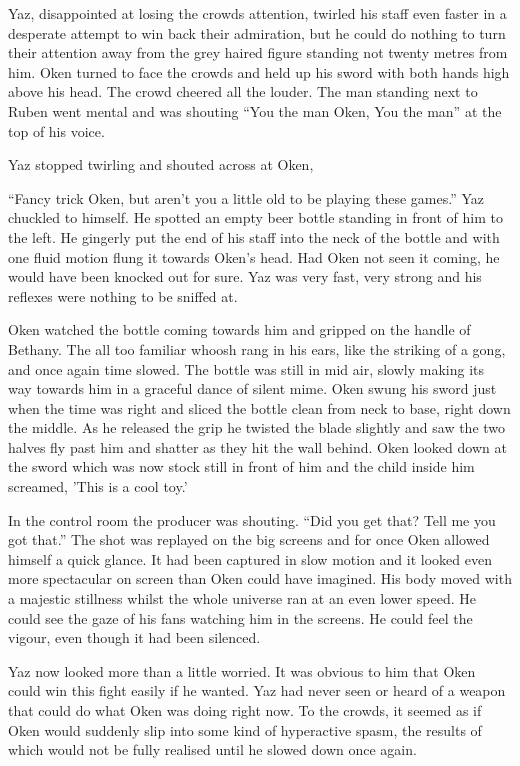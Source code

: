Yaz, disappointed at losing the crowds attention, twirled his staff even faster in a desperate attempt to win back their admiration, but he could do nothing to turn their attention away from the grey haired figure standing not twenty metres from him.  Oken turned to face the crowds and held up his sword with both hands high above his head.  The crowd cheered all the louder.  The man standing next to Ruben went mental and was shouting ``You the man Oken, You the man'' at the top of his voice.

Yaz stopped twirling and shouted across at Oken,

``Fancy trick Oken, but aren't you a little old to be playing these games.''  Yaz chuckled to himself.  He spotted an empty beer bottle standing in front of him to the left.  He gingerly put the end of his staff into the neck of the bottle and with one fluid motion flung it towards Oken's head.  Had Oken not seen it coming, he would have been knocked out for sure.  Yaz was very fast, very strong and his reflexes were nothing to be sniffed at.

Oken watched the bottle coming towards him and gripped on the handle of Bethany.  The all too familiar whoosh rang in his ears,  like the striking of a gong, and once again time slowed.  The bottle was still in mid air, slowly making its way towards him in a graceful dance of silent mime.  Oken swung his sword just when the time was right and sliced the bottle clean from neck to base, right down the middle.  As he released the grip he twisted the blade slightly and saw the two halves fly past him and shatter as they hit the wall behind.  Oken looked down at the sword which was now stock still in front of him and the child inside him screamed, 'This is a cool toy.'  

In the control room the producer was shouting. ``Did you get that?  Tell me you got that.''  The shot was replayed on the big screens and for once Oken allowed himself a quick glance.  It had been captured in slow motion and it looked even more spectacular on screen than Oken could have imagined.  His body moved with a majestic stillness whilst the whole universe ran at an even lower speed.  He could see the gaze of his fans watching him in the screens.  He could feel the vigour, even though it had been silenced.

Yaz now looked more than a little worried.  It was obvious to him that Oken could win this fight easily if he wanted.  Yaz had never seen or heard of a weapon that could do what Oken was doing right now.  To the crowds, it seemed as if Oken would suddenly slip into some kind of hyperactive spasm, the results of which would not be fully realised until he slowed down once again.  

